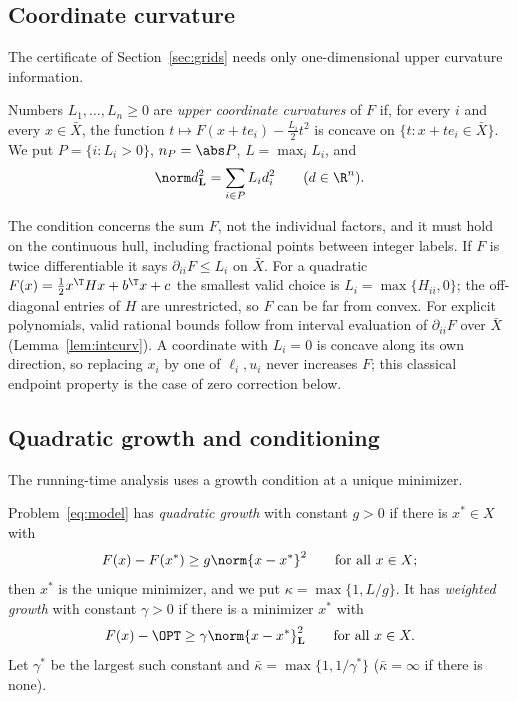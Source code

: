 \subsection{Coordinate curvature}
The certificate of Section~\ref{sec:grids} needs only one-dimensional upper
curvature information.

\begin{definition}\label{def:curvature}
Numbers $L_1,\dots,L_n\ge0$ are \emph{upper coordinate curvatures} of $F$ if,
for every $i$ and every $x\in\bar X$, the function
$t\mapsto F(x+te_i)-\frac{L_i}{2}t^2$ is concave on
$\{t:x+te_i\in\bar X\}$. We put $P=\{i:L_i>0\}$, $n_P=\abs P$, $L=\max_iL_i$,
and
\[
\norm d_{\mathbf L}^2=\sum_{i\in P}L_id_i^2\qquad(d\in\R^n).
\]
\end{definition}

The condition concerns the sum $F$, not the individual factors, and it must
hold on the continuous hull, including fractional points between integer
labels. If $F$ is twice differentiable it says $\partial_{ii}F\le L_i$ on
$\bar X$. For a quadratic $F(x)=\frac12x^\T Hx+b^\T x+c$ the smallest valid
choice is $L_i=\max\{H_{ii},0\}$; the off-diagonal entries of $H$ are
unrestricted, so $F$ can be far from convex. For explicit polynomials, valid
rational bounds follow from interval evaluation of $\partial_{ii}F$ over $\bar X$
(Lemma~\ref{lem:intcurv}). A coordinate with $L_i=0$ is concave along its own
direction, so replacing $x_i$ by one of $\ell_i,u_i$ never increases $F$; this
classical endpoint property \cite{Rosenberg1972,DelPiaKhajavirad2026} is the
case of zero correction below.

\subsection{Quadratic growth and conditioning}
The running-time analysis uses a growth condition at a unique minimizer.

\begin{definition}\label{def:growth}
Problem~\eqref{eq:model} has \emph{quadratic growth} with constant $g>0$ if
there is $x^*\in X$ with
\begin{equation}\label{eq:growth}
F(x)-F(x^*)\ge g\norm{x-x^*}^2\qquad\text{for all }x\in X ;
\end{equation}
then $x^*$ is the unique minimizer, and we put $\kappa=\max\{1,L/g\}$. It has
\emph{weighted growth} with constant $\gamma>0$ if there is a minimizer $x^*$ with
\begin{equation}\label{eq:wgrowth}
F(x)-\OPT\ge\gamma\norm{x-x^*}_{\mathbf L}^2\qquad\text{for all }x\in X .
\end{equation}
Let $\gamma^*$ be the largest such constant and $\bar\kappa=\max\{1,1/\gamma^*\}$
($\bar\kappa=\infty$ if there is none).
\end{definition}

